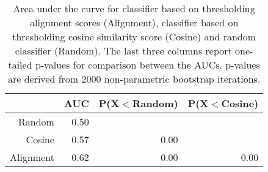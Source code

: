 \begin{table}[ht]
\centering
\begin{tabular}{rrrr}
  \hline
 & AUC & P(X$<$Random) & P(X$<$Cosine) \\ 
  \hline
Random & 0.50 &  &  \\ 
  Cosine & 0.57 & 0.00 &  \\ 
  Alignment & 0.62 & 0.00 & 0.00 \\ 
   \hline
\end{tabular}
\caption{Area under the curve for classifier based
       on thresholding alignment scores (Alignment), classifier based on 
       thresholding cosine similarity score (Cosine) and random 
       classifier (Random). The last three columns report one-tailed p-values for 
       comparison between the AUCs. p-values are derived from 2000 non-parametric
       bootstrap iterations.} 
\label{tab:ncsl_auc}
\end{table}
